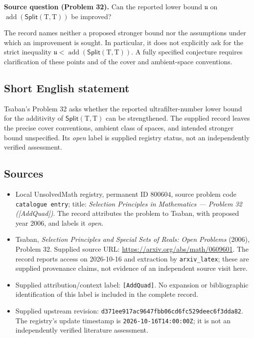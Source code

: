 \documentclass[11pt]{article}
\begin{document}
\textbf{Source question (Problem 32).} Can the reported lower bound \(\mathfrak{u}\) on \(\operatorname{add}(\mathsf{Split}(\mathrm{T},\mathrm{T}))\) be improved?

The record names neither a proposed stronger bound nor the assumptions under which an improvement is sought. In particular, it does not explicitly ask for the strict inequality \(\mathfrak{u}<\operatorname{add}(\mathsf{Split}(\mathrm{T},\mathrm{T}))\). A fully specified conjecture requires clarification of these points and of the cover and ambient-space conventions.
\subsection{Short English statement}
Tsaban's Problem 32 asks whether the reported ultrafilter-number lower bound for the additivity of \(\mathsf{Split}(\mathrm{T},\mathrm{T})\) can be strengthened. The supplied record leaves the precise cover conventions, ambient class of spaces, and intended stronger bound unspecified. Its \emph{open} label is supplied registry status, not an independently verified assessment.
\subsection{Sources}
\begin{itemize}
\item Local UnsolvedMath registry, permanent ID \(800604\), source problem code \texttt{catalogue entry}; title: \emph{Selection Principles in Mathematics --- Problem 32 ([AddQuad])}. The record attributes the problem to Tsaban, with proposed year 2006, and labels it \emph{open}.
\item Tsaban, \emph{Selection Principles and Special Sets of Reals: Open Problems} (2006), Problem 32. Supplied source URL: \url{https://arxiv.org/abs/math/0609601}. The record reports access on 2026-10-16 and extraction by \texttt{arxiv\_latex}; these are supplied provenance claims, not evidence of an independent source visit here.
\item Supplied attribution/context label: \texttt{[AddQuad]}. No expansion or bibliographic identification of this label is included in the complete record.
\item Supplied upstream revision: \texttt{d371ee917ac9647fbb06cd6fc529deec6f3dda82}. The registry's update timestamp is \texttt{2026-10-16T14:00:00Z}; it is not an independently verified literature assessment.
\end{itemize}
\end{document}
